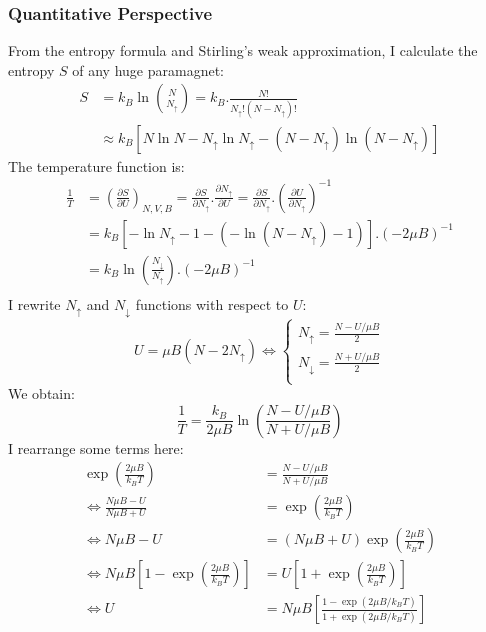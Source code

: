 \documentclass[~/PhyAI/phyai.tex]{subfiles}
\begin{document}
\subsubsection{Quantitative Perspective}
From the entropy formula and Stirling's weak approximation, I calculate the entropy $S$ of any huge paramagnet:
\begin{equation*}
	\begin{split}
		S&=k_{B}\ln\binom{N}{N_{\uparrow}}=k_{B}.\frac{N!}{N_{\uparrow}!(N-N_{\uparrow})!}\\&\approx k_{B}[N\ln{N}-N_{\uparrow}\ln{N_{\uparrow}}-(N-N_{\uparrow})\ln{(N-N_{\uparrow})}]
	\end{split}
\end{equation*}
The temperature function is:
\begin{equation*}
	\begin{split}
		\frac{1}{T}&=\left( \frac{\partial S }{\partial U}\right)_{N,V,B}=\frac{\partial S }{\partial N_{\uparrow}}.\frac{\partial N_{\uparrow}}{\partial U}=\frac{\partial S }{\partial N_{\uparrow}}.\left(\frac{\partial U}{\partial N_{\uparrow}}\right)^{-1}\\
		&=k_{B}[-\ln{N_{\uparrow}}-1-(-\ln{(N-N_{\uparrow})}-1)].(-2\mu B)^{-1}\\
		&=k_{B}\ln\left(\frac{N_{\downarrow}}{N_{\uparrow}}\right).(-2\mu B)^{-1}\\
	\end{split}
\end{equation*}
I rewrite $N_{\uparrow}$ and $N_{\downarrow}$ functions with respect to $U$:
\begin{equation*}
	U=\mu B(N-2N_{\uparrow})\Leftrightarrow
	\begin{cases}
		N_{\uparrow}=\frac{N-U/\mu B}{2}   \\
		N_{\downarrow}=\frac{N+U/\mu B}{2} \\
	\end{cases}
\end{equation*}
We obtain:
$$ \frac{1 }{T}=\frac{k_{B}}{2\mu B}\ln\left(\frac{N-U/\mu B}{N+U/\mu B}\right) $$
I rearrange some terms here:
\begin{equation*}
	\begin{split}
		\exp{\left(\frac{2\mu B}{k_{B}T}\right)}&=\frac{N-U/\mu B}{N+U/\mu B}\\
		\Leftrightarrow \frac{N\mu B -U }{N\mu B +U}&=\exp{\left(\frac{2\mu B}{k_{B}T}\right)}\\
		\Leftrightarrow N\mu B - U&=(N\mu B+U)\exp{\left(\frac{2\mu B}{k_{B}T}\right)}\\
		\Leftrightarrow N\mu B \left[1-\exp{\left(\frac{2\mu B}{k_{B}T}\right)}\right]&=U\left[1+\exp{\left(\frac{2\mu B}{k_{B}T}\right)}\right]\\
		\Leftrightarrow U&=N\mu B \left[\frac{1-\exp{(2\mu B/k_{B}T)}}{1+\exp{(2\mu B/k_{B}T)}}\right]
	\end{split}
\end{equation*}
\end{document}
